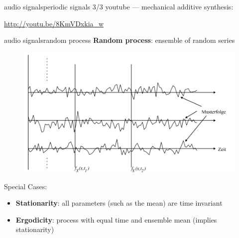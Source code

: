 \begin{frame}{audio signals}{periodic signals 3/3}
    youtube --- mechanical additive synthesis:
    
    \url{http://youtu.be/8KmVDxkia_w}
    
\end{frame}


	
\begin{frame}{audio signals}{random process}
	\textbf{Random process}: ensemble of random series
	\begin{figure}
		\centering
			\includegraphics[scale=.25]{graph/randomprocess}
	\end{figure}
	\pause
	Special Cases:
	\begin{itemize}
		\item	\textbf{Stationarity}: all parameters (such as the mean) are time invariant
		\item	\textbf{Ergodicity}: process with equal time and ensemble mean (implies stationarity)
	\end{itemize}
\end{frame}
	
